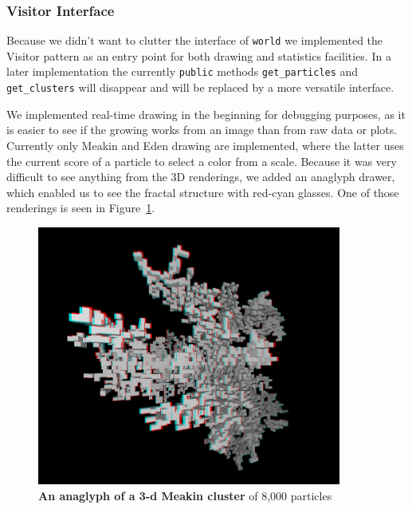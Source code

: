\documentclass[twocolumn, 10pt]{scrartcl}
\begin{document}
            \subsubsection{Visitor Interface}
                Because we didn't want to clutter the interface of \lstinline'world' we implemented the Visitor
                pattern\cite{bib-visitor} as an entry point for both drawing and statistics facilities. In a later
                implementation the currently \lstinline'public' methods \lstinline'get_particles' and
                \lstinline'get_clusters' will disappear and will be replaced by a more versatile interface.

                We implemented real-time drawing in the beginning for debugging purposes, as it is easier to see if the
                growing works from an image than from raw data or plots. Currently only Meakin and Eden drawing are
                implemented, where the latter uses the current score of a particle to select a color from a scale.
                Because it was very difficult to see anything from the 3D renderings, we added an anaglyph drawer, which
                enabled us to see the fractal structure with red-cyan glasses. One of those renderings is seen in
                Figure~\ref{fig-anaglyph}.
                \begin{figure}
                    \center
                    \includegraphics[width=10cm]{img/anaglyph.png}
                    \caption[An anaglyph of a 3-d Meakin cluster]
                        {\small\textbf{An anaglyph of a 3-d Meakin cluster} of 8,000 particles}
                    \label{fig-anaglyph}
                \end{figure}
\end{document}
